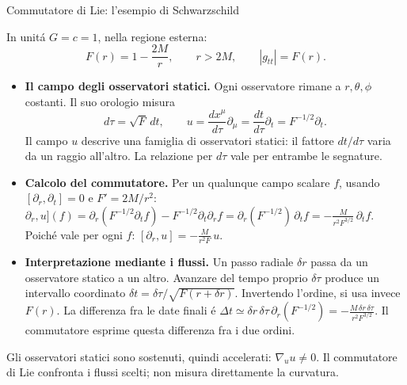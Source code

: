 \begin{frame}[t]{Commutatore di Lie: l'esempio di Schwarzschild}
\small\raggedright
In unit\'a $G=c=1$, nella regione esterna:
\[
F(r)=1-\frac{2M}{r},\qquad r>2M,\qquad |g_{tt}|=F(r).
\]
\begin{itemize}
\item \textbf{Il campo degli osservatori statici.}
Ogni osservatore rimane a $r,\theta,\phi$ costanti.
Il suo orologio misura
\[
d\tau=\sqrt F\,dt,\qquad
u=\frac{dx^\mu}{d\tau}\partial_\mu
=\frac{dt}{d\tau}\partial_t
=F^{-1/2}\partial_t.
\]
Il campo $u$ descrive una famiglia di osservatori statici:
il fattore $dt/d\tau$ varia da un raggio all'altro.
La relazione per $d\tau$ vale per entrambe le segnature.
\item \textbf{Calcolo del commutatore.}
Per un qualunque campo scalare $f$, usando
$[\partial_r,\partial_t]=0$ e $F'=2M/r^2$:
$\partial_r,u](f)=\partial_r(F^{-1/2}\partial_t f)-F^{-1/2}\partial_t\partial_r f=\partial_r(F^{-1/2})\,\partial_t f=-\frac{M}{r^2F^{3/2}}\,\partial_t f$.
Poich\'e vale per ogni $f$: $[\partial_r,u]=-\frac{M}{r^2F}\,u$.
\item \textbf{Interpretazione mediante i flussi.} Un passo radiale $\delta r$ passa da un osservatore statico
a un altro. Avanzare del tempo proprio $\delta\tau$ produce un intervallo coordinato
$\delta t=\delta\tau/\sqrt{F(r+\delta r)}$.
Invertendo l'ordine, si usa invece $F(r)$.
La differenza fra le date finali \'e $\Delta t\simeq\delta r\,\delta\tau\,\partial_r(F^{-1/2})=-\frac{M\,\delta r\,\delta\tau}{r^2F^{3/2}}$.
Il commutatore esprime questa differenza fra i due ordini.
\end{itemize}
Gli osservatori statici sono sostenuti, quindi accelerati:
$\nabla_u u\ne0$.
Il commutatore di Lie confronta i flussi scelti;
non misura direttamente la curvatura.
\end{frame}

